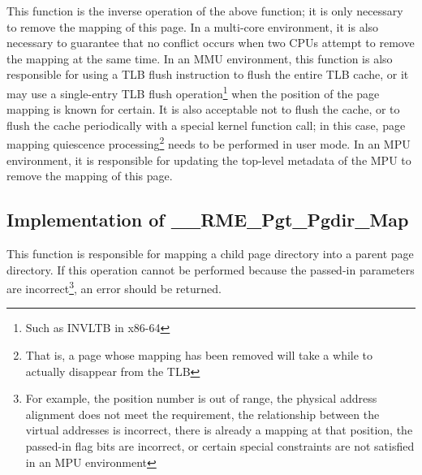 This function is the inverse operation of the above function; it is only necessary to remove the mapping of this page. In a multi-core environment, it is also necessary to guarantee that no conflict occurs when two CPUs attempt to remove the mapping at the same time. In an MMU environment, this function is also responsible for using a TLB flush instruction to flush the entire TLB cache, or it may use a single-entry TLB flush operation\footnote{Such as INVLTB in x86-64} when the position of the page mapping is known for certain. It is also acceptable not to flush the cache, or to flush the cache periodically with a special kernel function call; in this case, page mapping quiescence processing\footnote{That is, a page whose mapping has been removed will take a while to actually disappear from the TLB} needs to be performed in user mode. In an MPU environment, it is responsible for updating the top-level metadata of the MPU to remove the mapping of this page.

\subsection{Implementation of \_\_RME\_Pgt\_Pgdir\_Map}\label{subsec:7-rme-pgt-pgdir-map-implementation}

This function is responsible for mapping a child page directory into a parent page directory. If this operation cannot be performed because the passed-in parameters are incorrect\footnote{For example, the position number is out of range, the physical address alignment does not meet the requirement, the relationship between the virtual addresses is incorrect, there is already a mapping at that position, the passed-in flag bits are incorrect, or certain special constraints are not satisfied in an MPU environment}, an error should be returned.

